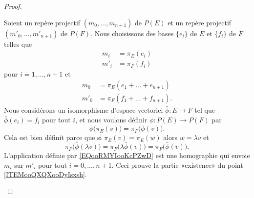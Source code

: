 \begin{proof}
\begin{subproof}
            Soient un repère projectif \( (m_0,\ldots, m_{n+1})\) de \( P(E)\) et un repère projectif \( (m'_0,\ldots, m'_{n+1})\) de \( P(F)\). Nous choisissons des bases \( \{ e_i \}\) de \( E\) et \(  \{ f_i \}\) de \( F\) telles que
            \begin{subequations}
                \begin{align}
                    m_i&=\pi_E(e_i)\\
                    m'_i&=\pi_F(f_i)
                \end{align}
            \end{subequations}
            pour \( i=1,\ldots, n+1\) et
            \begin{subequations}
                \begin{align}
                    m_0&=\pi_E(e_1+\ldots +e_{n+1})\\
                    m'_0&=\pi_F(f_1+\ldots +f_{n+1}).
                \end{align}
            \end{subequations}
            Nous considérons un isomorphisme d'espace vectoriel \( \bar\phi\colon E\to F\) tel que \( \bar\phi(e_i)=f_i\) pour tout \( i\), et nous voulons définir \( \phi\colon P(E)\to P(F)\) par
            \begin{equation}        \label{EQooRMYIooKcPZwD}
                \phi\big( \pi_E(v) \big)=\pi_F\big( \bar\phi(v) \big).
            \end{equation}
            Cela est bien définit parce que si \( \pi_E(v)=\pi_E(w)\) alors \( w=\lambda v\) et
            \begin{equation}
                \pi_F\big( \bar\phi(\lambda v) \big)=\pi_F\big( \lambda\bar\phi(v) \big)=\pi_F\big( \bar\phi(v) \big).
            \end{equation}
            L'application définie par \eqref{EQooRMYIooKcPZwD} est une homographie qui envoie \( m_i\) sur \( m'_i\) pour tout \( i=0,\ldots, n+1\). Ceci prouve la partie «existence» du point \ref{ITEMooQXQXooDyIsxsh}.


\end{subproof}
\end{proof}
